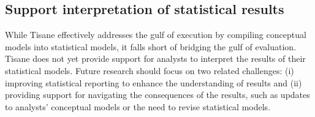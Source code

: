 \begin{comment}
As demonstrations of how better programming abstractions and automated reasoning
can enable statistical non-experts to author analyses and improve the quality of
statistical analysis, Tea and Tisane...

Tea and Tisane have demonstrated the benefit of using higher levels of
abstraction focused on conceptual knowledge expression and reasoning. They
primarily orient the question of design...They can serve as building blocks for START HERE

Has this dissertation lost its way? Further re-orienting towards what users *really* want: to understand their domain
Push further in directions this work orients us 
- more support for understanding results, especially when some questions may not be answerable with the data/how it was collected
- knowing how robust the results are --> why not just multiverse everything?
**how do we resolve and come out from under the tyranny of false positive rates fear
\end{comment}

\subsection{Support interpretation of statistical results}

While Tisane effectively addresses the gulf of execution by compiling conceptual
models into statistical models, it falls short of bridging the gulf of
evaluation. Tisane does not yet provide support for analysts to interpret the
results of their statistical models. Future research should focus on two related
challenges: (i) improving statistical reporting to enhance the understanding of
results and (ii) providing support for navigating the consequences of the
results, such as updates to analysts' conceptual models or the need to revise
statistical models.

